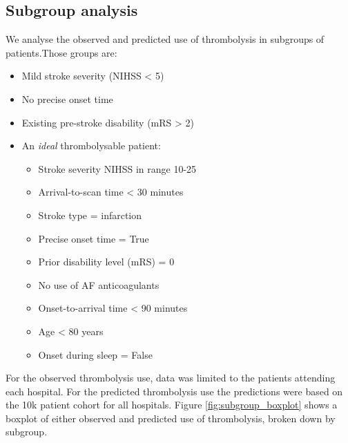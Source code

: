 \subsection{Subgroup analysis}

We analyse the observed and predicted use of thrombolysis in subgroups of patients.Those groups are:

\begin{itemize}
\item Mild stroke severity (NIHSS \textless{} 5)
\item No precise onset time
\item Existing pre-stroke disability (mRS \textgreater{} 2)
\item An \emph{ideal} thrombolysable patient:
  \begin{itemize}
  \item Stroke severity NIHSS in range 10-25
  \item Arrival-to-scan time \textless{} 30 minutes
  \item Stroke type = infarction
  \item Precise onset time = True
  \item Prior disability level (mRS) = 0
  \item No use of AF anticoagulants
  \item Onset-to-arrival time \textless{} 90 minutes
  \item Age \textless{} 80 years
  \item Onset during sleep = False
  \end{itemize}
\end{itemize}

For the observed thrombolysis use, data was limited to the patients attending each hospital. For the predicted thrombolysis use the predictions were based on the 10k patient cohort for all hospitals. Figure \ref{fig:subgroup_boxplot} shows a boxplot of either observed and predicted use of thrombolysis, broken down by subgroup.

